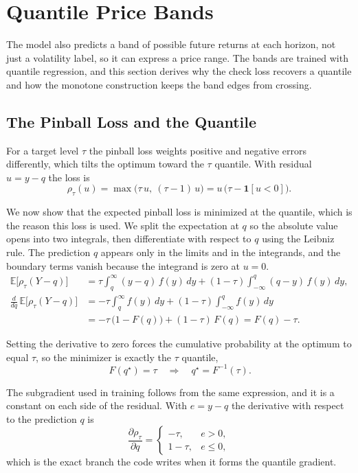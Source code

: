 \documentclass[12pt,letterpaper]{article}
\begin{document}
\clearpage
\section{Quantile Price Bands}

The model also predicts a band of possible future returns at each horizon, not
just a volatility label, so it can express a price range. The bands are trained
with quantile regression, and this section derives why the check loss recovers a
quantile and how the monotone construction keeps the band edges from crossing.

\subsection{The Pinball Loss and the Quantile}

For a target level $\tau$ the pinball loss weights positive and negative errors
differently, which tilts the optimum toward the $\tau$ quantile. With residual
$u = y - q$ the loss is
\[
\rho_\tau(u) = \max\bigl(\tau\,u,\ (\tau-1)\,u\bigr)
= u\,\bigl(\tau - \mathbf{1}[u < 0]\bigr).
\]

We now show that the expected pinball loss is minimized at the quantile, which is
the reason this loss is used. We split the expectation at $q$ so the absolute
value opens into two integrals, then differentiate with respect to $q$ using the
Leibniz rule. The prediction $q$ appears only in the limits and in the
integrands, and the boundary terms vanish because the integrand is zero at
$u = 0$.
\begin{align*}
\mathbb{E}\bigl[\rho_\tau(Y - q)\bigr]
  &= \tau \int_{q}^{\infty} (y - q)\,f(y)\,dy
   + (1-\tau)\int_{-\infty}^{q} (q - y)\,f(y)\,dy, \\
\frac{d}{dq}\,\mathbb{E}\bigl[\rho_\tau(Y - q)\bigr]
  &= -\tau \int_{q}^{\infty} f(y)\,dy
   + (1-\tau)\int_{-\infty}^{q} f(y)\,dy \\
  &= -\tau\,\bigl(1 - F(q)\bigr) + (1-\tau)\,F(q)
   = F(q) - \tau .
\end{align*}

Setting the derivative to zero forces the cumulative probability at the optimum
to equal $\tau$, so the minimizer is exactly the $\tau$ quantile,
\[
\boxed{\,F(q^\star) = \tau \quad\Longrightarrow\quad q^\star = F^{-1}(\tau).}
\]

The subgradient used in training follows from the same expression, and it is a
constant on each side of the residual. With $e = y - q$ the derivative with
respect to the prediction $q$ is
\[
\frac{\partial \rho_\tau}{\partial q} =
\begin{cases}
-\tau, & e > 0, \\
1 - \tau, & e \le 0,
\end{cases}
\]
which is the exact branch the code writes when it forms the quantile gradient.
\end{document}

